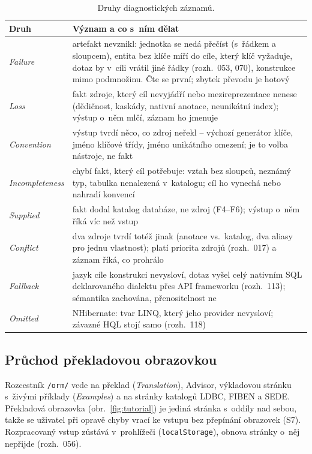 \documentclass{article}
\begin{document}
\begin{table}[ht]
\centering\small
\begin{tabularx}{\textwidth}{L{2.6cm} Y}
\toprule
\textbf{Druh} & \textbf{Význam a co s~ním dělat} \\
\midrule
\emph{Failure} & artefakt nevznikl: jednotka se nedá přečíst (s~řádkem a sloupcem), entita bez klíče míří do cíle, který klíč vyžaduje, dotaz by v~cíli vrátil jiné řádky (rozh.~053, 070), konstrukce mimo podmnožinu. Čte se první; zbytek převodu je hotový \\
\emph{Loss} & fakt zdroje, který cíl nevyjádří nebo mezireprezentace nenese (dědičnost, kaskády, nativní anotace, neunikátní index); výstup o~něm mlčí, záznam ho jmenuje \\
\emph{Convention} & výstup tvrdí něco, co zdroj neřekl -- výchozí generátor klíče, jméno klíčové třídy, jméno unikátního omezení; je to volba nástroje, ne fakt \\
\emph{Incompleteness} & chybí fakt, který cíl potřebuje: vztah bez sloupců, neznámý typ, tabulka nenalezená v~katalogu; cíl ho vynechá nebo nahradí konvencí \\
\emph{Supplied} & fakt dodal katalog databáze, ne zdroj (F4--F6); výstup o~něm říká víc než vstup \\
\emph{Conflict} & dva zdroje tvrdí totéž jinak (anotace vs.\ katalog, dva aliasy pro jednu vlastnost); platí priorita zdrojů (rozh.~017) a záznam říká, co prohrálo \\
\emph{Fallback} & jazyk cíle konstrukci nevysloví, dotaz vyšel celý nativním SQL deklarovaného dialektu přes API frameworku (rozh.~113); sémantika zachována, přenositelnost ne \\
\emph{Omitted} & NHibernate: tvar LINQ, který jeho provider nevysloví; závazné HQL stojí samo (rozh.~118) \\
\bottomrule
\end{tabularx}
\caption{Druhy diagnostických záznamů.}
\label{tab:zaznamy}
\end{table}

\subsection{Průchod překladovou obrazovkou}\label{sec:tutorial}

Rozcestník \texttt{/orm/} vede na překlad (\emph{Translation}), Advisor, výkladovou stránku s~živými příklady (\emph{Examples}) a na stránky katalogů LDBC, FIBEN a SEDE. Překladová obrazovka (obr.~\ref{fig:tutorial}) je jediná stránka s~oddíly nad sebou, takže se uživatel při opravě chyby vrací ke vstupu bez přepínání obrazovek (S7). Rozpracovaný vstup zůstává v~prohlížeči (\texttt{localStorage}), obnova stránky o~něj nepřijde (rozh.~056).
\end{document}
